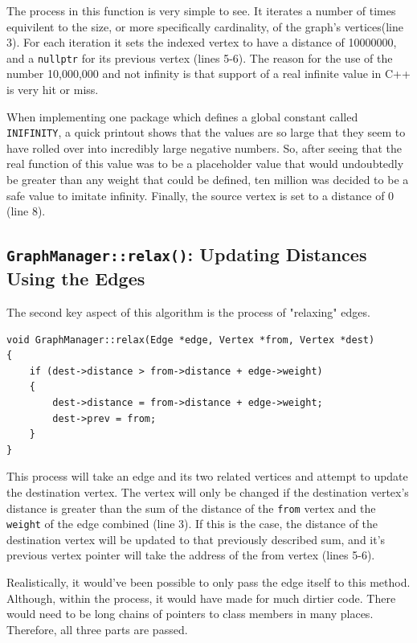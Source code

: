 \documentclass[letterpaper, 10pt]{article}
\begin{document}
The process in this function is very simple to see. It iterates a number of times equivilent to the size,  or more specifically cardinality, of the graph's vertices(line 3). For each iteration it sets the indexed vertex to have a distance of 10000000, and a \texttt{nullptr} for its previous vertex (lines 5-6). The reason for the use of the number 10,000,000 and not infinity is that support of a real infinite value in C++ is very hit or miss. 

When implementing one package which defines a global constant called \texttt{INIFINITY}, a quick printout shows that the values are so large that they seem to have rolled over into  incredibly large negative numbers. So, after seeing that the real function of this value was to be a placeholder value that would undoubtedly be greater than any weight that could be defined, ten million was decided to be a safe value to imitate infinity. Finally, the source vertex is set to a distance of 0 (line 8).



\subsection{\texttt{GraphManager::relax()}: Updating Distances Using the Edges}

The second key aspect of this algorithm is the process of "relaxing" edges.

 \begin{addmargin}[-5em]{1em}
\begin{small}
\begin{verbatim}
void GraphManager::relax(Edge *edge, Vertex *from, Vertex *dest)
{
	if (dest->distance > from->distance + edge->weight)
	{
		dest->distance = from->distance + edge->weight;
		dest->prev = from;
	}
}
\end{verbatim}
\end{small}
\end{addmargin}      
This process will take an edge and its two related vertices and attempt to update the destination vertex. The vertex will only be changed if the destination vertex's distance is greater than the sum of the distance of the \texttt{from} vertex and the \texttt{weight} of the edge combined (line 3). If this is the case,  the distance of the destination vertex will be updated to that previously described sum, and it's previous vertex pointer will take the address of the from vertex (lines 5-6). 

Realistically, it would've been possible to only pass the edge itself to this method. Although, within the process, it would have made for much dirtier code. There would need to be long chains of pointers to class members in many places. Therefore, all three parts are passed.
\end{document}

